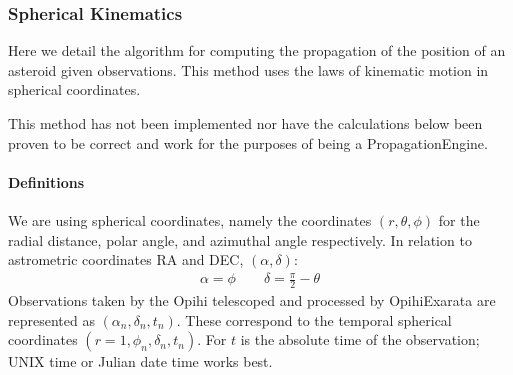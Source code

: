 \documentclass[letterpaper,11pt,english]{sphinxmanual}
\begin{document}
\subsubsection{Spherical Kinematics}
\label{\detokenize{technical/algorithms/spherical_kinematics:spherical-kinematics}}\label{\detokenize{technical/algorithms/spherical_kinematics::doc}}
\sphinxAtStartPar
Here we detail the algorithm for computing the propagation of the position of
an asteroid given observations. This method uses the laws of kinematic motion
in spherical coordinates.

\sphinxAtStartPar
{}This method has not been implemented nor have the calculations below been
proven to be correct and work for the purposes of being a PropagationEngine.


\paragraph{Definitions}
\label{\detokenize{technical/algorithms/spherical_kinematics:definitions}}
\sphinxAtStartPar
We are using spherical coordinates, namely the coordinates
\((r, \theta, \phi)\) for the radial distance, polar angle, and azimuthal
angle respectively. In relation to astrometric coordinates RA and DEC,
\((\alpha, \delta)\):
\begin{equation*}
\begin{split}\alpha = \phi   \qquad   \delta = \frac{\pi}{2} - \theta\end{split}
\end{equation*}
\sphinxAtStartPar
Observations taken by the Opihi telescoped and processed by OpihiExarata are
represented as \((\alpha_n, \delta_n, t_n)\). These correspond to the
temporal spherical coordinates \((r=1, \phi_n, \delta_n, t_n)\). For
\(t\) is the absolute time of the observation; UNIX time or Julian date
time works best.
\end{document}
